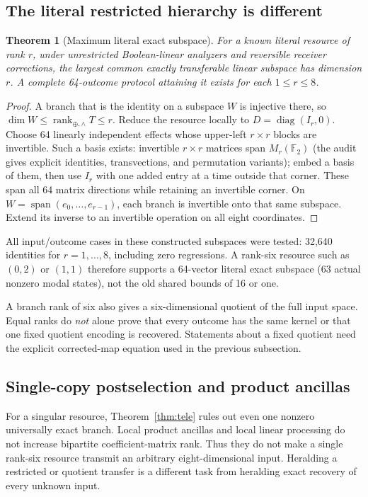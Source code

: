 \documentclass[11pt,a4paper]{article}
\newtheorem{theorem}{Theorem}[section]
\theoremstyle{definition}\newtheorem{definition}[theorem]{Definition}
\newcommand{\F}{\mathbb F_2}
\newcommand{\rk}{\operatorname{rank}_{\oplus,\wedge}}
\newcommand{\spn}{\operatorname{span}}
\begin{document}
\subsection{The literal restricted hierarchy is different}
\begin{theorem}[Maximum literal exact subspace]
For a known literal resource of rank $r$, under unrestricted Boolean-linear analyzers and reversible receiver corrections, the largest common exactly transferable linear subspace has dimension $r$. A complete 64-outcome protocol attaining it exists for each $1\le r\le8$.
\end{theorem}
\begin{proof}
A branch that is the identity on a subspace $W$ is injective there, so $\dim W\le\rk T\le r$. Reduce the resource locally to $D=\operatorname{diag}(I_r,0)$. Choose 64 linearly independent effects whose upper-left $r\times r$ blocks are invertible. Such a basis exists: invertible $r\times r$ matrices span $M_r(\F)$ (the audit gives explicit identities, transvections, and permutation variants); embed a basis of them, then use $I_r$ with one added entry at a time outside that corner. These span all 64 matrix directions while retaining an invertible corner. On $W=\spn(e_0,\ldots,e_{r-1})$, each branch is invertible onto that same subspace. Extend its inverse to an invertible operation on all eight coordinates.
\end{proof}
All input/outcome cases in these constructed subspaces were tested: 32,640 identities for $r=1,\ldots,8$, including zero regressions. A rank-six resource such as $(0,2)$ or $(1,1)$ therefore supports a 64-vector literal exact subspace (63 actual nonzero modal states), not the old shared bounds of 16 or one.

A branch rank of six also gives a six-dimensional quotient of the full input space. Equal ranks do \emph{not} alone prove that every outcome has the same kernel or that one fixed quotient encoding is recovered. Statements about a fixed quotient need the explicit corrected-map equation used in the previous subsection.

\subsection{Single-copy postselection and product ancillas}
For a singular resource, Theorem~\ref{thm:tele} rules out even one nonzero universally exact branch. Local product ancillas and local linear processing do not increase bipartite coefficient-matrix rank. Thus they do not make a single rank-six resource transmit an arbitrary eight-dimensional input. Heralding a restricted or quotient transfer is a different task from heralding exact recovery of every unknown input.
\end{document}
